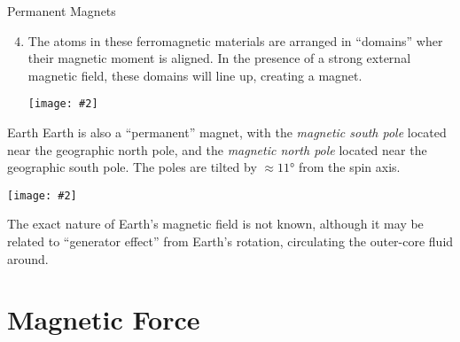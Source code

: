 \documentclass[12pt,aspectratio=169]{beamer}
\newcommand{\pic}[2]{\texttt{[image: \#2]}}
\begin{document}
\begin{frame}{Permanent Magnets}
  \begin{enumerate}
    \setcounter{enumi}{3}
  \item The atoms in these ferromagnetic materials are arranged in ``domains''
    wher their magnetic moment is aligned. In the presence of a strong
    external magnetic field, these domains will line up, creating a magnet.
    \begin{center}
      \pic{.6}{domain}
    \end{center}
  \end{enumerate}
\end{frame}


    
\begin{frame}{Earth}
  Earth is also a ``permanent'' magnet, with the \emph{magnetic south pole}
  located near the geographic north pole, and the \emph{magnetic north pole}
  located near the geographic south pole. The poles are tilted by
  $\approx\ang{11}$ from the spin axis.
  \begin{center}
    \pic{.5}{mearthbar}
  \end{center}
  The exact nature of Earth's magnetic field is not known, although it may be
  related to ``generator effect'' from Earth's rotation, circulating the
  outer-core fluid around.
\end{frame}


\section{Magnetic Force}
\end{document}

